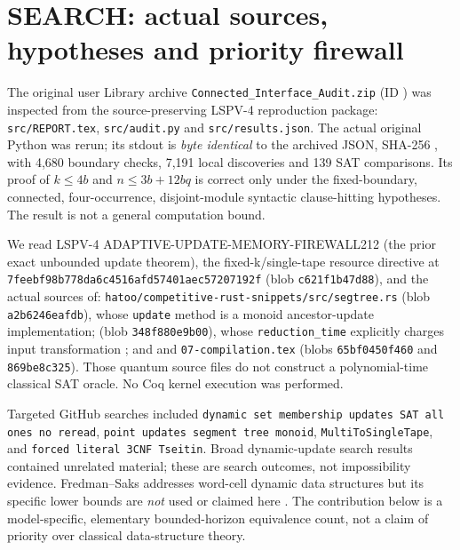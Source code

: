 \documentclass[11pt]{article}
\begin{document}
\section{SEARCH: actual sources, hypotheses and priority firewall}
The original user Library archive \texttt{Connected\_Interface\_Audit.zip} (ID ) was inspected from the source-preserving LSPV-4 reproduction package: \texttt{src/REPORT.tex}, \texttt{src/audit.py} and \texttt{src/results.json}. The actual original Python was rerun; its stdout is \emph{byte identical} to the archived JSON, SHA-256 {\footnotesize{}}, with 4,680 boundary checks, 7,191 local discoveries and 139 SAT comparisons. Its proof of $k\le4b$ and $n\le3b+12bq$ is correct only under the fixed-boundary, connected, four-occurrence, disjoint-module syntactic clause-hitting hypotheses. The result is not a general computation bound.

We read LSPV-4 ADAPTIVE-UPDATE-MEMORY-FIREWALL212 (the prior exact unbounded update theorem), the fixed-k/single-tape resource directive at \texttt{7feebf98b778da6c4516afd57401aec57207192f} (blob \texttt{c621f1b47d88}), and the actual sources of: \texttt{hatoo/competitive-rust-snippets/src/segtree.rs} (blob \texttt{a2b6246eafdb}), whose \texttt{update} method is a monoid ancestor-update implementation;  (blob \texttt{348f880e9b00}), whose \texttt{reduction\_time} explicitly charges input transformation \cite{gaeher}; and  and \texttt{07-compilation.tex} (blobs \texttt{65bf0450f460} and \texttt{869be8c325}). Those quantum source files do not construct a polynomial-time classical SAT oracle. No Coq kernel execution was performed.

Targeted GitHub searches included \texttt{dynamic set membership updates SAT all ones no reread}, \texttt{point updates segment tree monoid}, \texttt{MultiToSingleTape}, and \texttt{forced literal 3CNF Tseitin}. Broad dynamic-update search results contained unrelated material; these are search outcomes, not impossibility evidence. Fredman--Saks addresses word-cell dynamic data structures but its specific lower bounds are \emph{not} used or claimed here \cite{fredmansaks}. The contribution below is a model-specific, elementary bounded-horizon equivalence count, not a claim of priority over classical data-structure theory.
\end{document}
